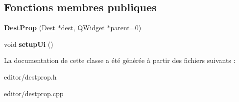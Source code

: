 \subsection*{Fonctions membres publiques}
\begin{DoxyCompactItemize}
\item 
\hypertarget{classDestProp_accf41a3f4a376030696fca6daff74cff}{{\bfseries Dest\+Prop} (\hyperlink{classDest}{Dest} $\ast$dest, Q\+Widget $\ast$parent=0)}\label{classDestProp_accf41a3f4a376030696fca6daff74cff}

\item 
\hypertarget{classDestProp_a41ab256b3cb0fe805f1078d232802439}{void {\bfseries setup\+Ui} ()}\label{classDestProp_a41ab256b3cb0fe805f1078d232802439}

\end{DoxyCompactItemize}


La documentation de cette classe a été générée à partir des fichiers suivants \+:\begin{DoxyCompactItemize}
\item 
editor/destprop.\+h\item 
editor/destprop.\+cpp\end{DoxyCompactItemize}
